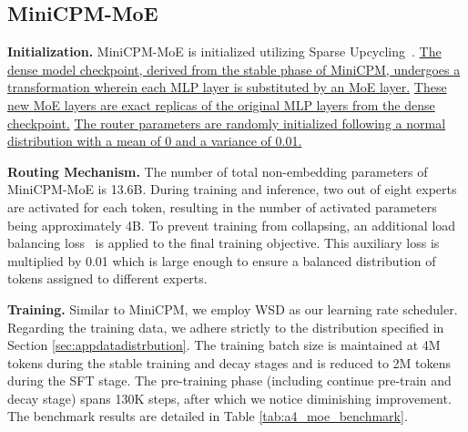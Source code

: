 \subsection{MiniCPM-MoE}

\textbf{Initialization.}
MiniCPM-MoE is initialized utilizing Sparse Upcycling~\citep{komatsuzaki2022sparse}. \uline{The dense model checkpoint, derived from the stable phase of MiniCPM, undergoes a transformation wherein each MLP layer is substituted by an MoE layer.} \uline{These new MoE layers are exact replicas of the original MLP layers from the dense checkpoint.} \uline{The router parameters are randomly initialized following a normal distribution with a mean of 0 and a variance of 0.01.}

\textbf{Routing Mechanism.}
The number of total non-embedding parameters of MiniCPM-MoE is 13.6B. 
During training and inference, two out of eight experts are activated for each token, resulting in the number of activated parameters being approximately 4B. To prevent training from collapsing, an additional load balancing loss~\citep{fedus2022switch} is applied to the final training objective. This auxiliary loss is multiplied by 0.01 which is large enough to ensure a balanced distribution of tokens assigned to different experts.

\textbf{Training.}
 Similar to MiniCPM, we employ WSD as our learning rate scheduler. Regarding the training data, we adhere strictly to the distribution specified in Section \ref{sec:appdatadistrbution}. The training batch size is maintained at 4M tokens during the stable training and decay stages and is reduced to 2M tokens during the SFT stage. The pre-training phase (including continue pre-train and decay stage) spans 130K steps, after which we notice diminishing improvement. The benchmark results are detailed in Table \ref{tab:a4_moe_benchmark}.


